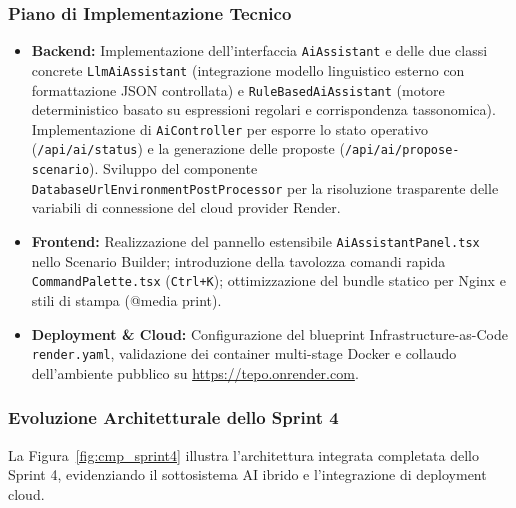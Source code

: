\subsubsection{Piano di Implementazione Tecnico}
\begin{itemize}[leftmargin=1.4em, itemsep=0.2em]
    \item \textbf{Backend:} Implementazione dell'interfaccia \texttt{AiAssistant} e delle due classi concrete \texttt{LlmAiAssistant} (integrazione modello linguistico esterno con formattazione JSON controllata) e \texttt{RuleBasedAiAssistant} (motore deterministico basato su espressioni regolari e corrispondenza tassonomica). Implementazione di \texttt{AiController} per esporre lo stato operativo (\texttt{/api/ai/status}) e la generazione delle proposte (\texttt{/api/ai/propose-scenario}). Sviluppo del componente \texttt{DatabaseUrlEnvironmentPostProcessor} per la risoluzione trasparente delle variabili di connessione del cloud provider Render.
    \item \textbf{Frontend:} Realizzazione del pannello estensibile \texttt{AiAssistantPanel.tsx} nello Scenario Builder; introduzione della tavolozza comandi rapida \texttt{CommandPalette.tsx} (\texttt{Ctrl+K}); ottimizzazione del bundle statico per Nginx e stili di stampa (@media print).
    \item \textbf{Deployment \& Cloud:} Configurazione del blueprint Infrastructure-as-Code \texttt{render.yaml}, validazione dei container multi-stage Docker e collaudo dell'ambiente pubblico su \url{https://tepo.onrender.com}.
\end{itemize}

\subsubsection{Evoluzione Architetturale dello Sprint 4}
La Figura~\ref{fig:cmp_sprint4} illustra l'architettura integrata completata dello Sprint 4, evidenziando il sottosistema AI ibrido e l'integrazione di deployment cloud.


